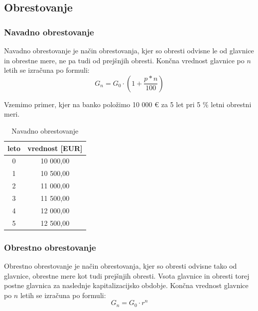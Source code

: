 \documentclass[12pt]{article}
\begin{document}
    \subsection{Obrestovanje}
        \subsubsection{Navadno obrestovanje}
        Navadno obrestovanje je način obrestovanja, kjer so obresti odvisne le od glavnice
        in obrestne mere, ne pa tudi od prejšnjih obresti. Končna vrednost glavnice po $n$
        letih se izračuna po formuli:
        \begin{equation}
            G_n = G_0 \cdot (1 + \frac{p*n}{100})
        \end{equation}

        Vzemimo primer, kjer na banko položimo 10 000 € za 5 let pri 5 \% letni obrestni meri. 
        \begin{center}
            \begin{table}[h!]
                \centering
                \begin{tabular}{|c|c|}
                    \hline
                    \textbf{leto} & \textbf{vrednost [EUR]} \\ \hline
                    0 & 10 000,00 \\ \hline
                    1 & 10 500,00 \\ \hline
                    2 & 11 000,00 \\ \hline
                    3 & 11 500,00 \\ \hline
                    4 & 12 000,00 \\ \hline
                    5 & 12 500,00 \\ \hline
                \end{tabular}
                \caption{Navadno obrestovanje}
            \end{table}
        \end{center}

        \subsubsection{Obrestno obrestovanje}
        Obrestno obrestovanje je način obrestovanja, kjer so obresti odvisne tako od 
        glavnice, obrestne mere kot tudi prejšnjih obresti. Vsota glavnice in obresti torej 
        postne glavnica za naslednje kapitalizacijsko obdobje. Končna vrednost glavnice 
        po $n$ letih se izračuna po formuli:
        \begin{equation}
            G_n = G_0 \cdot r^n
        \end{equation}
\end{document}
